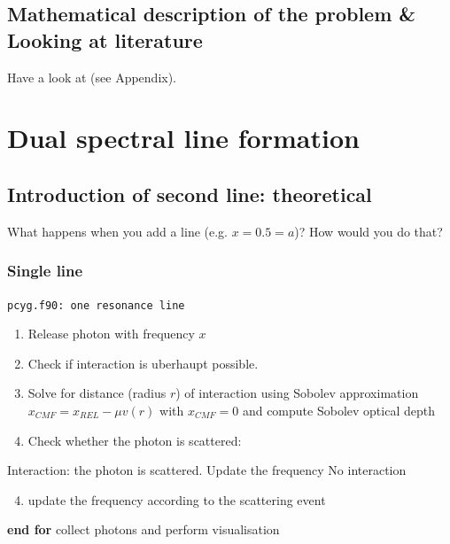 \documentclass[../main/main.tex]{subfiles}
\begin{document}
\subsection{Mathematical description of the problem \&
Looking at literature}
Have a look at \cite{NoebauerUlrichM_2019MCRT} (see Appendix).

\newpage
\section{Dual spectral line formation}
\label{two_resonance_lines}

\subsection{Introduction of second line: theoretical}
\label{second_line}
What happens when you add a line (e.g. \@ $x=0.5=a$)? How would you do that?

\subsubsection{Single line}
\begin{center}
\vspace{-0.45cm}
\begin{algorithm}[!htp]
\caption{\texttt{pcyg.f90: one resonance line}}
\label{pcyg_one_line}
\begin{algorithmic}

\begin{enumerate}
\item Release photon with frequency $x$
\item Check if interaction is uberhaupt possible.
\item Solve for distance (radius $r$) of interaction using Sobolev approximation $x_{CMF} = x_{REL} - \mu v(r)$ with $\boxed{x_{CMF} = 0}$ and compute Sobolev optical depth
\item Check whether the photon is scattered:
\end{enumerate}
\State Interaction: the photon is scattered. Update the frequency
\Else \State No interaction
\EndIf

\begin{enumerate}
\setcounter{enumi}{3}
\item update the frequency according to the scattering event
\end{enumerate}
	
\EndFor
\State \textbf{end for}
\State collect photons and perform visualisation

\end{algorithmic}
\end{algorithm}
\end{center}
\end{document}
